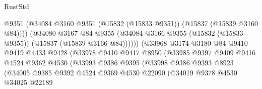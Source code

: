 \begin{lexlean}{RustStd}
\begin{coremodule}
{\begin{coremodule}
{{{{{{{{{{{{{{{{{{{{{{{{{{{{{{{{{{{{{{{{{{{{{{{{{{{{{{{{{{{{                                        @9351
                                        (@34084
                                          @3160
                                          @9351
                                          (@15832 (@15833 @9351))
                                          (@15837 (@15839 @3160 @84))))
                                      (@34080
                                        @3167
                                        @84
                                        @9355
                                        (@34084
                                          @3166
                                          @9355
                                          (@15832 (@15833 @9355))
                                          (@15837 (@15839 @3166 @84))))))
                                  (@33968
                                    @3174
                                    @3180
                                    @84
                                    @9410
                                    @9419
                                    @4433
                                    @9428
                                    (@33978
                                      @9410
                                      @9417
                                      @8950
                                      (@33985
                                        @9397
                                        @9409
                                        @9416
                                        @4524
                                        @9362
                                        @4530
                                        (@33993
                                          @9386
                                          @9395
                                          (@33998
                                            @9386
                                            @9393
                                            @8923
                                            (@34005
                                              @9385
                                              @9392
                                              @4524
                                              @9369
                                              @4530
                                              @22090
                                              (@34019
                                                @9378
                                                @4530
                                                @34025
                                                @22189
}}}}}}}}}}}}}}}}}}}}}}}}}}}}}}}}}}}}}}}}}}}}}}}}}}}}}}}}}}}}
\end{coremodule}}
\end{coremodule}
\end{lexlean}
